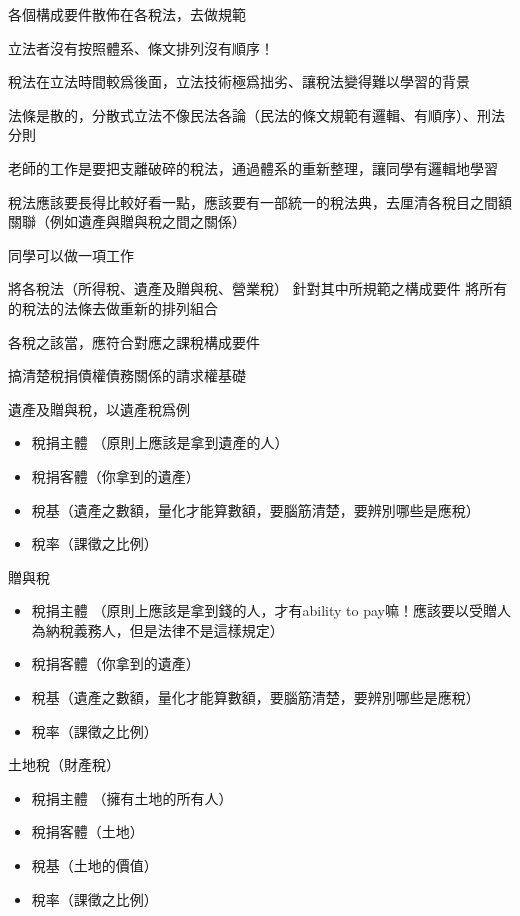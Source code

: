 \documentclass[]{ctexbook}
\providecommand{\tightlist}{%
  \setlength{\itemsep}{0pt}\setlength{\parskip}{0pt}}
\begin{document}
各個構成要件散佈在各稅法，去做規範

立法者沒有按照體系、條文排列沒有順序！

稅法在立法時間較爲後面，立法技術極爲拙劣、讓稅法變得難以學習的背景

法條是散的，分散式立法不像民法各論（民法的條文規範有邏輯、有順序）、刑法分則

老師的工作是要把支離破碎的稅法，通過體系的重新整理，讓同學有邏輯地學習

稅法應該要長得比較好看一點，應該要有一部統一的稅法典，去厘清各稅目之間額關聯（例如遺產與贈與稅之間之關係）

同學可以做一項工作

將各稅法（所得稅、遺產及贈與稅、營業稅）
針對其中所規範之構成要件
將所有的稅法的法條去做重新的排列組合

各稅之該當，應符合對應之課稅構成要件

搞清楚稅捐債權債務關係的請求權基礎

遺產及贈與稅，以遺產稅爲例

\begin{itemize}
\tightlist
\item
  稅捐主體 （原則上應該是拿到遺產的人）
\item
  稅捐客體（你拿到的遺產）
\item
  稅基（遺產之數額，量化才能算數額，要腦筋清楚，要辨別哪些是應稅）
\item
  稅率（課徵之比例）
\end{itemize}

贈與稅

\begin{itemize}
\tightlist
\item
  稅捐主體 （原則上應該是拿到錢的人，才有ability to pay嘛！應該要以受贈人為納稅義務人，但是法律不是這樣規定）
\item
  稅捐客體（你拿到的遺產）
\item
  稅基（遺產之數額，量化才能算數額，要腦筋清楚，要辨別哪些是應稅）
\item
  稅率（課徵之比例）
\end{itemize}

土地稅（財產稅）

\begin{itemize}
\tightlist
\item
  稅捐主體 （擁有土地的所有人）
\item
  稅捐客體（土地）
\item
  稅基（土地的價值）
\item
  稅率（課徵之比例）
\end{itemize}
\end{document}
